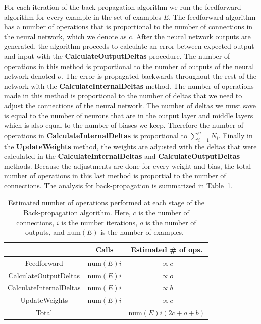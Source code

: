 \documentclass[11pt]{article}
\begin{document}
For each iteration of the back-propagation algorithm we run the feedforward algorithm for every example in the set of examples $E$. The
feedforward algorithm has a number of operations that is proportional to the number of connections in the neural network, which we
denote as $c$. After the neural network outputs are generated, the algorithm proceeds to calculate an error between expected output and
input with the \textbf{CalculateOutputDeltas} procedure. The number of operations in this method is proportional to the number of
outputs of the neural network denoted $o$. The error is propagated backwards throughout the rest of the network with the
\textbf{CalculateInternalDeltas} method. The number of operations made in this method is proportional to the number of deltas that we
need to adjust the connections of the neural network. The number of deltas we must save is equal to the number of neurons that are in
the output layer and middle layers which is also equal to the number of biases we keep. Therefore the number of operations in
\textbf{CalculateInternalDeltas} is proportional to $\sum_{i=1}^{n}N_{i}$. Finally in the \textbf{UpdateWeights} method, the weights are
adjusted with the deltas that were calculated in the \textbf{CalculateInternalDeltas} and \textbf{CalculateOutputDeltas} methods.
Because the adjustments are done for every weight and bias, the total number of operations in this last method is proportial to the
number of connections. The analysis for back-propagation is summarized in Table~\ref{tab:backpropagation}.

\begin{table} 
	\begin{center}
		\begin{tabular}{ccc}
		\hline
		& Calls & Estimated \# of ops.\\
		\hline
		Feedforward & $\mbox{num}(E)i$ & $\propto c$\\
		CalculateOutputDeltas & $\mbox{num}(E)i$ & $\propto o$\\
		CalculateInternalDeltas & $\mbox{num}(E)i$ & $\propto b$\\
		UpdateWeights & $\mbox{num}(E)i$ & $\propto c$\\
		\hline
		Total & & $\mbox{num}(E)i(2c+o+b)$\\
		\hline
		\end{tabular}
		\caption{Estimated number of operations performed at each stage of the Back-propagation algorithm. Here, $c$ is the number of connections, $i$ is the number iterations, $o$ is the number of outputs, and $\mbox{num}(E)$ is the number of examples.~\label{tab:backpropagation}}
	\end{center}
\end{table}
\end{document}
